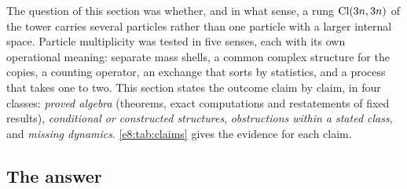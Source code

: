 The question of this section was whether, and in what sense, a rung $\mathrm{Cl}(3n,3n)$ of the tower carries several particles rather than one
particle with a larger internal space. Particle multiplicity was tested in five senses, each with its own operational meaning: separate
mass shells, a common complex structure for the copies, a counting operator, an exchange that sorts by statistics, and a process that takes
one to two. This section states the outcome claim by claim, in four classes: \emph{proved algebra} (theorems, exact computations and
restatements of fixed results), \emph{conditional or constructed structures}, \emph{obstructions within a stated class}, and
\emph{missing dynamics}. \cref{e8:tab:claims} gives the evidence for each claim.

\subsection{The answer}
\label{e8:sec:answer}

